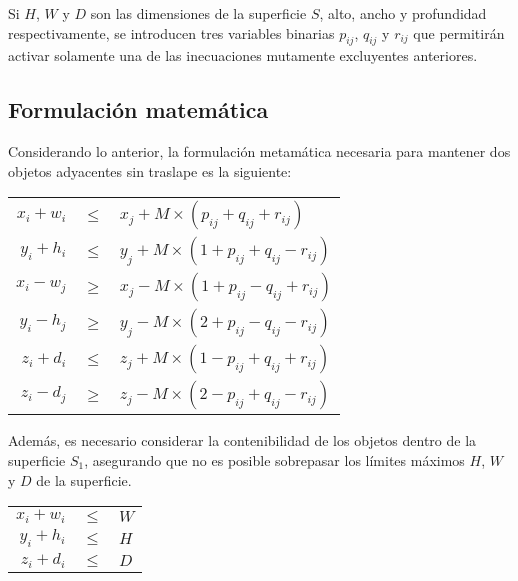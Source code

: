 Si $H$, $W$ y $D$ son las dimensiones de la superficie $S$, alto, ancho y
profundidad res\-pectivamente, se introducen tres variables binarias
$p_{ij}$, $q_{ij}$ y $r_{ij}$ que permitirán activar solamente una de
las inecuaciones mutamente excluyentes anteriores. \\
\pagebreak

\subsection{Formulación matemática}

Considerando lo anterior, la formulación metamática necesaria para
mantener dos objetos adyacentes sin traslape es la siguiente:

\begin{center}
\begin{tabular}{r c l}
$x_i + w_i$ & $\le$ & $x_j + M \times (p_{ij} + q_{ij} + r_{ij})$ \\
$y_i + h_i$ & $\le$ & $y_j + M \times (1 + p_{ij} + q_{ij} - r_{ij})$ \\
$x_i - w_j$ & $\ge$ & $x_j - M \times (1 + p_{ij} - q_{ij} + r_{ij})$ \\
$y_i - h_j$ & $\ge$ & $y_j - M \times (2 + p_{ij} - q_{ij} - r_{ij})$ \\
$z_i + d_i$ & $\le$ & $z_j + M \times (1 - p_{ij} + q_{ij} + r_{ij})$ \\
$z_i - d_j$ & $\ge$ & $z_j - M \times (2 - p_{ij} + q_{ij} - r_{ij})$ \\
\end{tabular}
\end{center}

Además, es necesario considerar la contenibilidad de los objetos dentro
de la superficie $S_1$, asegurando que no es posible sobrepasar los
límites máximos $H$, $W$ y $D$ de la superficie. \\

\begin{center}
\begin{tabular}{r c l}
$x_i + w_i$ & $\le$ & $W$ \\
$y_i + h_i$ & $\le$ & $H$ \\
$z_i + d_i$ & $\le$ & $D$ \\
\end{tabular}
\end{center}
